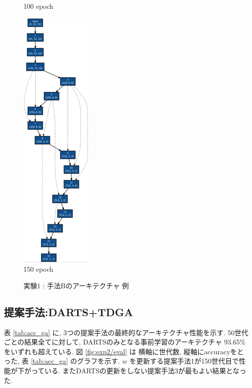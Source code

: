 \begin{figure}[tb]
\begin{minipage}{0.3\hsize}
\begin{center}
    100 epoch
 	\end{center}
 \end{minipage}
 \begin{minipage}{0.3\hsize}
 	\begin{center}
    \includegraphics[clip,scale=0.8]{./fig/04.exp/b150.png}\\
    150 epoch
 	\end{center}
 \end{minipage}
 \caption{実験1 : 手法Bのアーキテクチャ 例}
 \label{fig:exp1_b}
\end{figure}





\clearpage\newpage
\changeindent{0cm}
\subsection{提案手法:DARTS+TDGA}
\label{sec:exp.02}
\changeindent{2cm}

表 \ref{tab:acc_ga} に, 3つの提案手法の最終的なアーキテクチャ性能を示す.
50世代ごとの結果全てに対して, DARTSのみとなる事前学習のアーキテクチャ 93.65\%をいずれも超えている.
図 \ref{fig:exp2/eval} は 横軸に世代数, 縦軸にaccuracyをとった,
表 \ref{tab:acc_ga} のグラフを示す.
$w$ を更新する提案手法1が150世代目で性能が下がっている.
またDARTSの更新をしない提案手法3が最もよい結果となった.


